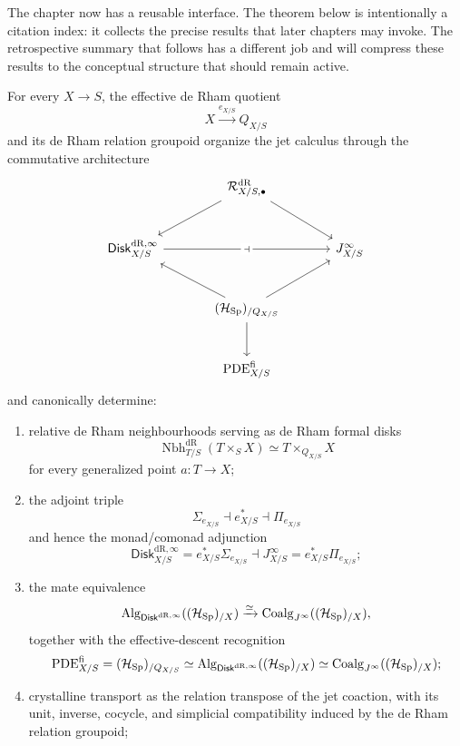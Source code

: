 The chapter now has a reusable interface. The theorem below is intentionally a
citation index: it collects the precise results that later chapters may invoke.
The retrospective summary that follows has a different job and will compress
these results to the conceptual structure that should remain active.
\begin{theorem}
For every \(X\to S\), the effective de Rham quotient
\[
  X\xrightarrow{e_{X/S}}Q_{X/S}
\]
and its de Rham relation groupoid organize the jet calculus through the
commutative architecture
\[
\begin{tikzcd}[column sep=large,row sep=large]
&
\mathcal R^{\mathrm{dR}}_{X/S,\bullet}
  \ar[dl]
  \ar[dr]
&\\
\mathsf{Disk}^{\mathrm{dR},\infty}_{X/S}
  \ar[rr,"\dashv" description]
&&
J^\infty_{X/S}\\
&
(\mathcal H_{\Sp})_{/Q_{X/S}}
  \ar[ul]
  \ar[ur]
  \ar[d]
&\\
&
\operatorname{PDE}^{\mathrm{fi}}_{X/S}
&
\end{tikzcd}
\]
and canonically determine:
\begin{enumerate}
\item relative de Rham neighbourhoods serving as de Rham formal disks
\[
  \operatorname{Nbh}^{\mathrm{dR}}_{T/S}(T\times_SX)
  \simeq
  T\times_{Q_{X/S}}X
\]
for every generalized point \(a:T\to X\);

\item the adjoint triple
\[
  \Sigma_{e_{X/S}}
  \dashv
  e_{X/S}^*
  \dashv
  \Pi_{e_{X/S}}
\]
and hence the monad/comonad adjunction
\[
  \mathsf{Disk}^{\mathrm{dR},\infty}_{X/S}
  =
  e_{X/S}^*\Sigma_{e_{X/S}}
  \dashv
  J^\infty_{X/S}
  =
  e_{X/S}^*\Pi_{e_{X/S}};
\]

\item the mate equivalence
\[
  \operatorname{Alg}_{\mathsf{Disk}^{\mathrm{dR},\infty}}((\mathcal H_{\operatorname{Sp}})_{/X})
  \xrightarrow{\simeq}
  \operatorname{Coalg}_{J^\infty}((\mathcal H_{\operatorname{Sp}})_{/X}),
\]
together with the effective-descent recognition
\[
  \operatorname{PDE}^{\mathrm{fi}}_{X/S}
  =
  (\mathcal H_{\operatorname{Sp}})_{/Q_{X/S}}
  \simeq
  \operatorname{Alg}_{\mathsf{Disk}^{\mathrm{dR},\infty}}((\mathcal H_{\operatorname{Sp}})_{/X})
  \simeq
  \operatorname{Coalg}_{J^\infty}((\mathcal H_{\operatorname{Sp}})_{/X});
\]

\item crystalline transport as the relation transpose of the jet coaction,
with its unit, inverse, cocycle, and simplicial compatibility induced by the de Rham relation groupoid;


\end{enumerate}
\end{theorem}
